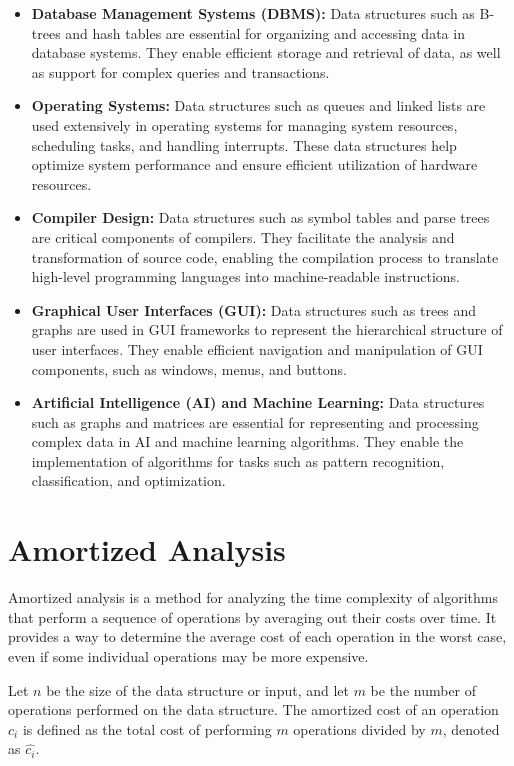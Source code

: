 \documentclass[12pt]{book} %
\begin{document}
\begin{itemize}
    \item \textbf{Database Management Systems (DBMS):} Data structures such as B-trees and hash tables are essential for organizing and accessing data in database systems. They enable efficient storage and retrieval of data, as well as support for complex queries and transactions.
    
    \item \textbf{Operating Systems:} Data structures such as queues and linked lists are used extensively in operating systems for managing system resources, scheduling tasks, and handling interrupts. These data structures help optimize system performance and ensure efficient utilization of hardware resources.
    
    \item \textbf{Compiler Design:} Data structures such as symbol tables and parse trees are critical components of compilers. They facilitate the analysis and transformation of source code, enabling the compilation process to translate high-level programming languages into machine-readable instructions.
    
    \item \textbf{Graphical User Interfaces (GUI):} Data structures such as trees and graphs are used in GUI frameworks to represent the hierarchical structure of user interfaces. They enable efficient navigation and manipulation of GUI components, such as windows, menus, and buttons.
    
    \item \textbf{Artificial Intelligence (AI) and Machine Learning:} Data structures such as graphs and matrices are essential for representing and processing complex data in AI and machine learning algorithms. They enable the implementation of algorithms for tasks such as pattern recognition, classification, and optimization.
\end{itemize}


\section{Amortized Analysis}
Amortized analysis is a method for analyzing the time complexity of algorithms that perform a sequence of operations by averaging out their costs over time. It provides a way to determine the average cost of each operation in the worst case, even if some individual operations may be more expensive. 

Let \(n\) be the size of the data structure or input, and let \(m\) be the number of operations performed on the data structure. The amortized cost of an operation \(c_i\) is defined as the total cost of performing \(m\) operations divided by \(m\), denoted as \(\hat{c_i}\).
\end{document}
